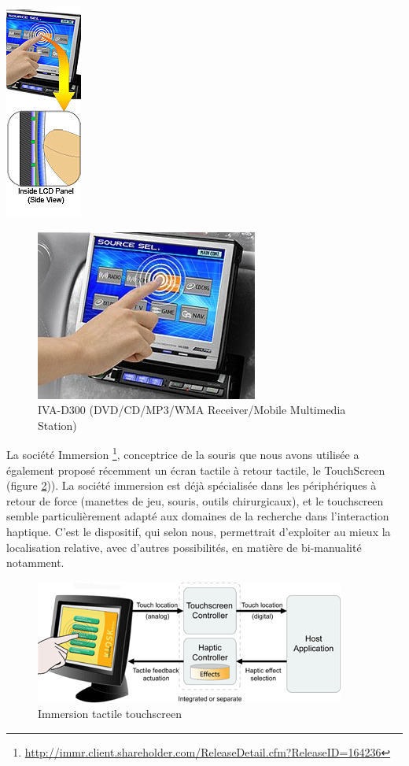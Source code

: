 \documentclass[
]{book}
\begin{document}
\includegraphics{img/demo_touch.jpg}

\begin{figure}
\centering
\includegraphics{img/iva-d300_hdr.jpg}
\caption{\label{fig:iva2}IVA-D300 (DVD/CD/MP3/WMA Receiver/Mobile Multimedia
Station)}
\end{figure}

La société Immersion \footnote{\url{http://immr.client.shareholder.com/ReleaseDetail.cfm?ReleaseID=164236}},
conceptrice de la souris que
nous avons utilisée a également proposé récemment un écran tactile à retour
tactile, le TouchScreen (figure \ref{fig:touchscreen})). La
société immersion est déjà spécialisée dans les périphériques à retour de
force (manettes de jeu, souris, outils chirurgicaux), et le touchscreen
semble particulièrement adapté aux domaines de la recherche dans
l'interaction haptique. C'est le dispositif, qui selon nous, permettrait
d'exploiter au mieux la localisation relative, avec d'autres possibilités, en
matière de bi-manualité notamment.

\begin{figure}
\centering
\includegraphics{img/touchscreen.png}
\caption{\label{fig:touchscreen}Immersion tactile touchscreen}
\end{figure}
\end{document}
